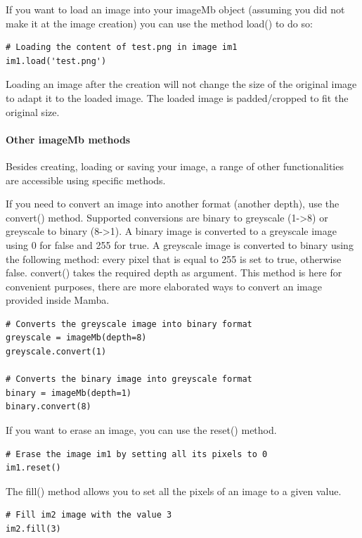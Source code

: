 \documentclass[a4paper,10pt,oneside]{article}
\begin{document}
If you want to load an image into your imageMb object (assuming you did not make
it at the image creation) you can use the method load() to do so:

\lstset{language=Python}
\begin{lstlisting}
# Loading the content of test.png in image im1
im1.load('test.png')
\end{lstlisting}

Loading an image after the creation will not change the size of the original 
image to adapt it to the loaded image. The loaded image is padded/cropped to fit
the original size.

\paragraph{Other imageMb methods}

Besides creating, loading or saving your image, a range of other functionalities
are accessible using specific methods.

If you need to convert an image into another format (another depth), use the 
convert() method. Supported conversions are binary to greyscale (1->8) or 
greyscale to binary (8->1). A binary image is converted to a greyscale image using
0 for false and 255 for true. A greyscale image is converted to binary using the
following method: every pixel that is equal to 255 is set to true, otherwise 
false. convert() takes the required depth as argument. This method is here for 
convenient purposes, there are more elaborated ways to convert an image provided
inside Mamba.

\lstset{language=Python}
\begin{lstlisting}
# Converts the greyscale image into binary format
greyscale = imageMb(depth=8)
greyscale.convert(1)

# Converts the binary image into greyscale format
binary = imageMb(depth=1)
binary.convert(8)
\end{lstlisting}

If you want to erase an image, you can use the reset() method. 

\lstset{language=Python}
\begin{lstlisting}
# Erase the image im1 by setting all its pixels to 0
im1.reset()
\end{lstlisting}

The fill() method allows you to set all the pixels of an image to a given value.

\lstset{language=Python}
\begin{lstlisting}
# Fill im2 image with the value 3
im2.fill(3)
\end{lstlisting}
\end{document}

